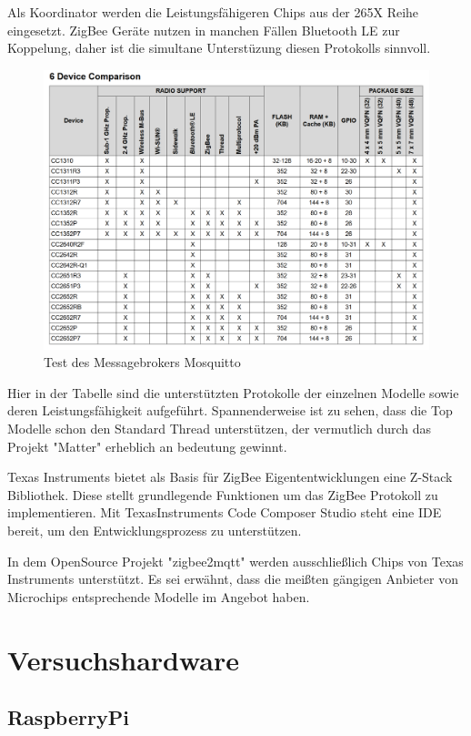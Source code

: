 Als Koordinator werden die Leistungsfähigeren Chips aus der 265X Reihe eingesetzt. ZigBee Geräte nutzen in manchen
Fällen Bluetooth LE zur Koppelung, daher ist die simultane Unterstüzung diesen Protokolls sinnvoll.

\begin{figure}[H]
  \centering
  \includegraphics[width=1\textwidth]{media/table265x.png}
  \caption{Test des Messagebrokers Mosquitto}
\end{figure}

Hier in der Tabelle sind die unterstützten Protokolle der einzelnen Modelle sowie deren Leistungsfähigkeit aufgeführt.
Spannenderweise ist zu sehen, dass die Top Modelle schon den Standard Thread unterstützen, der vermutlich durch das
Projekt "Matter" erheblich an bedeutung gewinnt.

Texas Instruments bietet als Basis für ZigBee Eigententwicklungen eine Z-Stack Bibliothek. Diese stellt grundlegende 
Funktionen um das ZigBee Protokoll zu implementieren. Mit TexasInstruments Code Composer Studio steht eine IDE bereit,
um den Entwicklungsprozess zu unterstützen.

In dem OpenSource Projekt "zigbee2mqtt" werden ausschließlich Chips von Texas Instruments unterstützt. Es sei erwähnt, 
dass die meißten gängigen Anbieter von Microchips entsprechende Modelle im Angebot haben. 

\section{Versuchshardware}

\subsection{RaspberryPi}

